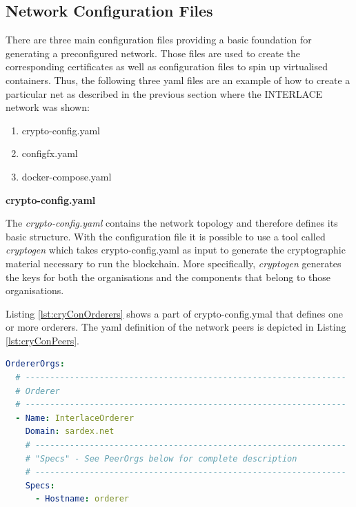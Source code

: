 \subsection{Network Configuration Files}
\label{sec:net-conf-files}

There are three main configuration files providing a basic foundation for generating a preconfigured network. Those files are used to create the corresponding certificates as well as configuration files to spin up virtualised containers. Thus, the following three yaml files are an example of how to create a particular net as described in the previous section where the INTERLACE network was shown:

\begin{enumerate}
	\item crypto-config.yaml
	\item configfx.yaml
	\item docker-compose.yaml
\end{enumerate}

\textbf{crypto-config.yaml}

The \textit{crypto-config.yaml} contains the network topology and therefore defines its basic structure. With the configuration file it is possible to use a tool called \textit{cryptogen} which takes crypto-config.yaml as input to generate the cryptographic material necessary to run the blockchain. More specifically, \textit{cryptogen} generates the keys for both the organisations and the components that belong to those organisations.

Listing \ref{lst:cryConOrderers} shows a part of crypto-config.ymal that defines one or more orderers. The yaml definition of the network peers is depicted in Listing \ref{lst:cryConPeers}.

\begin{center}
\begin{minipage}{0.8\textwidth}
\small
\begin{lstlisting}[language=yaml,firstnumber=1,caption={\bf\small crypto-config.yaml excerpt -- Orderer(s) definition},captionpos=b,label=lst:cryConOrderers]
OrdererOrgs:
  # -----------------------------------------------------------------
  # Orderer
  # -----------------------------------------------------------------
  - Name: InterlaceOrderer
    Domain: sardex.net
    # ---------------------------------------------------------------
    # "Specs" - See PeerOrgs below for complete description
    # ---------------------------------------------------------------
    Specs:
  	  - Hostname: orderer
\end{lstlisting}
\end{minipage}
\end{center}

